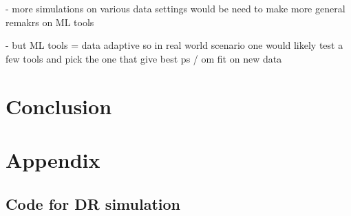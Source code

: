 \documentclass[12pt,twoside]{article}
\begin{document}
- more simulations on various data settings would be need to make more general remakrs on ML tools

- but ML tools = data adaptive so in real world scenario one would likely test a few tools and pick the one that give best ps / om fit on new data 

\section{Conclusion}

\clearpage



\clearpage
\section{Appendix}

\subsection*{Code for DR simulation}


\end{document}
